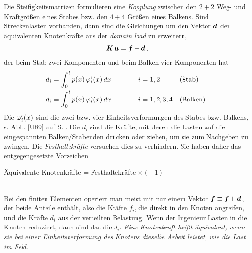 {{{{Die Steifigkeitsmatrizen formulieren eine {\em Kopplung \/} zwischen den $2 + 2$ Weg- und Kraftgr\"{o}{\ss}en eines Stabes bzw. den $4 + 4$ Gr\"{o}{\ss}en eines Balkens. Sind Streckenlasten vorhanden, dann sind die Gleichungen um den Vektor $\mbox{\boldmath $d$}$ der \"{a}quivalenten Knotenkr\"{a}fte aus der {\em domain load\/} zu erweitern,
\begin{align}
\mbox{\boldmath $K$}\,\mbox{\boldmath $u$} = \mbox{\boldmath $f$} + \mbox{\boldmath $d$}\,,
\end{align}
der beim Stab zwei Komponenten und beim Balken vier Komponenten hat
\begin{align}\label{Eq87}
d_i &= \int_0^{\,l} p(x)\,\varphi_i^e(x)\,dx \quad && i = 1,2 && \text{(Stab)}\\
d_i &= \int_0^{\,l} p(x)\,\varphi_i^e(x)\,dx \quad \qquad && i = 1,2,3,4 &&\text{(Balken)}\,.
\end{align}
Die $\varphi_i^e(x)$ sind die zwei bzw. vier Einheitsverformungen des Stabes bzw. Balkens, s. Abb. \ref{U89} auf S. \pageref{U89}. Die $d_i$ sind die Kr\"{a}fte, mit denen die Lasten auf die eingespannten Balken/Stabenden dr\"{u}cken oder ziehen, um sie zum Nachgeben zu zwingen. Die {\em Festhaltekr\"{a}fte\/} versuchen dies zu verhindern. Sie haben daher das entgegengesetzte Vorzeichen\\

\hspace*{-12pt}\colorbox{highlightBlue}{\parbox{0.98\textwidth}{\"{A}quivalente Knotenkr\"{a}fte = Festhaltekr\"{a}fte $\times (-1)$ }}\\

Bei den finiten Elementen operiert man meist mit nur einem Vektor $\mbox{\boldmath $f$} \equiv \mbox{\boldmath $f$} + \mbox{\boldmath $d$}$, der beide Anteile enth\"{a}lt, also die Kr\"{a}fte $f_i$, die direkt in den Knoten angreifen, und die Kr\"{a}fte $d_i$ aus der verteilten Belastung. Wenn der Ingenieur Lasten in die Knoten reduziert, dann sind  das die $d_i$. {\em Eine Knotenkraft hei{\ss}t \"{a}quivalent, wenn sie bei einer Einheitsverformung des Knotens dieselbe Arbeit leistet, wie die Last im Feld\/}.

}}}}

